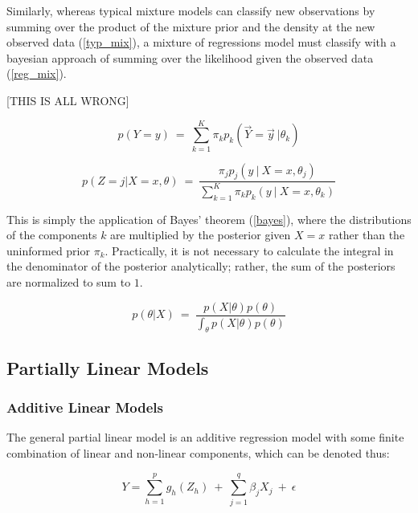 \documentclass[10pt]{olplainarticle}\usepackage[]{graphicx}\usepackage[]{color}
\begin{document}
Similarly, whereas typical mixture models can classify new observations by summing over the product of the mixture prior and the density at the new observed data (\ref{typ_mix}), a mixture of regressions model must classify with a bayesian approach of summing over the likelihood given the observed data (\ref{reg_mix}).

 [THIS IS ALL WRONG]

\begin{equation} \label{typ_mix}
  p(Y = y) \ =\ \sum_{k=1}^{K}\pi_k p_k(\vec{Y} = \vec{y}\ | \theta_k)
\end{equation}

\begin{equation} \label{reg_mix}
  p(Z = j | X = x, \theta) \ =\ \frac{\pi_j p_j(y \ | \ X = x, \theta_j)}{\sum_{k=1}^{K}\pi_k p_k(y \ | \ X = x, \theta_k)}
\end{equation}

This is simply the application of Bayes' theorem (\ref{bayes}), where the distributions of the components $k$ are multiplied by the posterior given $X = x$ rather than the uninformed prior $\pi_k$. Practically, it is not necessary to calculate the integral in the denominator of the posterior analytically; rather, the sum of the posteriors are normalized to sum to $1$.

\begin{equation} \label{bayes}
  p(\theta | X) \ =\ \frac{p(X|\theta)p(\theta)}{\int_{\theta}p(X|\theta)p(\theta)}
\end{equation}




\subsection{Partially Linear Models}

\subsubsection{Additive Linear Models} \label{gams}

The general partial linear model is an additive regression model with some finite combination of linear and non-linear components, which can be denoted thus:

\begin{equation} \label{partlin}
  Y = \sum_{h=1}^{p} g_{h} (Z_{h}) \ +\  \sum_{j=1}^{q} \beta_{j} X_{j} \ +\ \epsilon
\end{equation}
\end{document}
